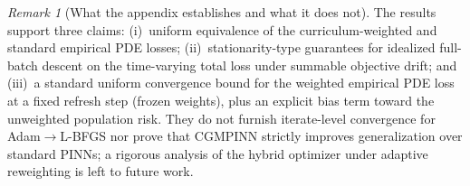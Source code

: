 \documentclass{article}
\theoremstyle{plain}
\theoremstyle{definition}
\theoremstyle{remark}
\newtheorem{remark}[theorem]{Remark}
\begin{document}
\begin{remark}[What the appendix establishes and what it does not]
	\label{rem:theory_limitations}
	The results support three claims:
	(i)~uniform equivalence of the curriculum-weighted and standard empirical
	PDE losses;
	(ii)~stationarity-type guarantees for idealized full-batch descent on the
	time-varying total loss under summable objective drift; and
	(iii)~a standard uniform convergence bound for the weighted empirical PDE
	loss at a fixed refresh step (frozen weights), plus an explicit bias term
	toward the unweighted population risk.
	They do not furnish iterate-level convergence for Adam$\to$L-BFGS nor prove
	that CGMPINN strictly improves generalization over standard PINNs; a
	rigorous analysis of the hybrid optimizer under adaptive reweighting is
	left to future work.
\end{remark}
\end{document}
